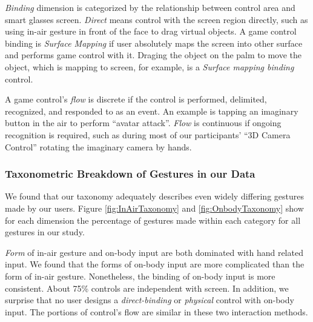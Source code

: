 \documentclass{sigchi}
\begin{document}
  \emph{Binding} dimension is categorized by the relationship between control area and smart glasses screen. \emph{Direct} means control with the screen region directly, such as using in-air gesture in front of the face to drag virtual objects. A game control binding is \emph{Surface Mapping} if user absolutely maps the screen into other surface and performs game control with it. Draging the object on the palm to move the object, which is mapping to screen, for example, is a \emph{Surface mapping binding} control. 

  A game control's \emph{flow} is discrete if the control is performed, delimited, recognized, and responded to as an event. An example is tapping an imaginary button in the air to perform ``avatar attack''. \emph{Flow} is continuous if ongoing recognition is required, such as during most of our participants' ``3D Camera Control'' rotating the imaginary camera by hands. 
 

 \subsubsection{Taxonometric Breakdown of Gestures in our Data}
We found that our taxonomy adequately describes even widely differing gestures made by our users. Figure \ref{fig:InAirTaxonomy} and \ref{fig:OnbodyTaxonomy} show for each dimension the percentage of gestures made within each category for all gestures in our study.


\emph{Form} of in-air gesture and on-body input are both dominated with hand related input. We found that the forms of on-body input are more complicated than the form of in-air gesture. Nonetheless, the binding of on-body input is more consistent. About 75\% controls are independent with screen. In addition, we surprise that no user designs a \emph{direct-binding} or \emph{physical} control with on-body input. The portions of control's flow are similar in these two interaction methods.
\end{document}

